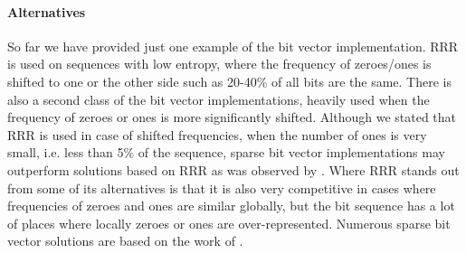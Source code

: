 \paragraph{Alternatives}

So far we have provided just one example of the bit vector implementation.
RRR is used on sequences with low entropy, where the frequency of zeroes/ones
is shifted to one or the other side such as 20-40\% of all bits are the same.
There is also a second class of the bit vector implementations, heavily
used when the frequency of zeroes or ones is more significantly shifted.
Although we stated that RRR is used in case of shifted frequencies, when the number
of ones is very small, i.e. less than 5\% of the sequence, sparse bit vector
implementations may outperform solutions based on RRR as was observed by \cite{navarro2012fast}.
Where RRR stands out from some of its alternatives is that it is also very competitive
in cases where frequencies of zeroes and ones are similar globally, but the bit
sequence has a lot of places where locally zeroes or ones are over-represented.
Numerous sparse bit vector solutions are based on the work of \cite{okanohara2007practical}.